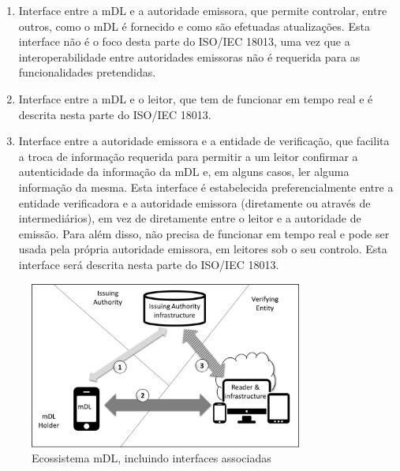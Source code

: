 \begin{enumerate}
	\item Interface entre a mDL e a autoridade emissora, que permite controlar, entre outros, como o mDL é fornecido e como são efetuadas atualizações. Esta interface não é o foco desta parte do ISO/IEC 18013, uma vez que a interoperabilidade entre autoridades emissoras não é requerida para as funcionalidades pretendidas.
	\item Interface entre a mDL e o leitor, que tem de funcionar em tempo real e é descrita nesta parte do ISO/IEC 18013.
	\item Interface entre a autoridade emissora e a entidade de verificação, que facilita a troca de informação requerida para permitir a um leitor confirmar a autenticidade da informação da mDL e, em alguns casos, ler alguma informação da mesma. Esta interface é estabelecida preferencialmente entre a entidade verificadora e a autoridade emissora (diretamente ou através de intermediários), em vez de diretamente entre o leitor e a autoridade de emissão. Para além disso, não precisa de funcionar em tempo real e pode ser usada pela própria autoridade emissora, em leitores sob o seu controlo. Esta interface será descrita nesta parte do ISO/IEC 18013.
\end{enumerate}

\begin{figure}[H]
	\centering
	\includegraphics[width=0.8\textwidth]{images/interfaces.png}
	\caption{Ecossistema mDL, incluindo interfaces associadas}
	\label{fig:interfaces}
\end{figure}


